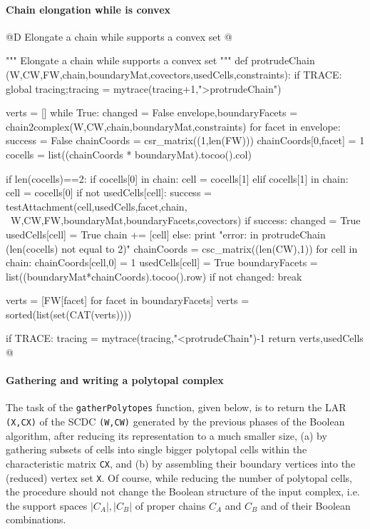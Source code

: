 \documentclass[11pt,oneside]{article}	%
\begin{document}
\paragraph{Chain elongation while is convex}

@D Elongate a chain while supports a convex set
@{""" Elongate a chain while supports a convex set """
def protrudeChain (W,CW,FW,chain,boundaryMat,covectors,usedCells,constraints):
	if TRACE: global tracing;tracing = mytrace(tracing+1,">protrudeChain")

	verts = []
	while True:	
		changed = False
		envelope,boundaryFacets = chain2complex(W,CW,chain,boundaryMat,constraints)
		for facet in envelope:
			success = False
			chainCoords = csr_matrix((1,len(FW)))
			chainCoords[0,facet] = 1
			cocells = list((chainCoords * boundaryMat).tocoo().col)
			
			if len(cocells)==2:
				if cocells[0] in chain: cell = cocells[1]
				elif cocells[1] in chain: cell = cocells[0]
				if not usedCells[cell]:
					success = testAttachment(cell,usedCells,facet,chain, \
								W,CW,FW,boundaryMat,boundaryFacets,covectors)
				if success: 
					changed = True
					usedCells[cell] = True
					chain += [cell]
			else: print "error: in protrudeChain (len(cocells) not equal to 2)"
			chainCoords = csc_matrix((len(CW),1))
			for cell in chain: 
				chainCoords[cell,0] = 1
				usedCells[cell] = True
			boundaryFacets = list((boundaryMat*chainCoords).tocoo().row)
		if not changed: break		
			
	verts = [FW[facet] for facet in boundaryFacets]
	verts = sorted(list(set(CAT(verts))))

	if TRACE: tracing = mytrace(tracing,"<protrudeChain")-1
	return verts,usedCells
@}

\paragraph{Gathering and writing a polytopal complex}

The task of the \texttt{gatherPolytopes} function, given below, is to return the LAR \texttt{(X,CX)} of the SCDC \texttt{(W,CW)} generated by the previous phases of the Boolean algorithm, after reducing its representation to a much smaller size, (a) by gathering subsets of cells into single bigger polytopal cells within the characteristic matrix \texttt{CX}, and (b) by assembling their boundary vertices into the (reduced) vertex set \texttt{X}. Of course, while reducing the number of polytopal cells, the procedure should not change the Boolean structure of the input complex, i.e. the support spaces $|C_A|, |C_B|$ of proper chains $C_A$ and $C_B$ and of their Boolean combinations.
\end{document}
